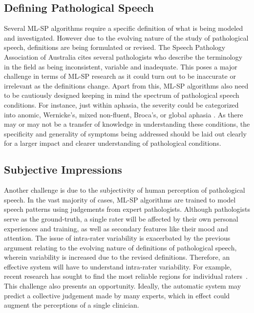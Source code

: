 \documentclass{article}
\begin{document}
\subsection{Defining Pathological Speech}
Several ML-SP algorithms require a specific definition of what is being modeled and investigated.
However due to the evolving nature of the study of pathological speech, definitions are being formulated or revised. 
The Speech Pathology Association of Australia \cite{australia2009criteria} cites several pathologists who describe the terminology in the field as being inconsistent, variable and inadequate. 
This poses a major challenge in terms of ML-SP research as it could turn out to be inaccurate or irrelevant as the definitions change.
Apart from this, ML-SP algorithms also need to be cautiously designed keeping in mind the spectrum of pathological speech conditions.
For instance, just within aphasia, the severity could be categorized into anomic, Wernicke's, mixed non-fluent, Broca's, or global aphasia \cite{mesulam1992primary}. 
As there may or may not be a transfer of knowledge in understanding these conditions, the specificity and generality of symptoms being addressed should be laid out clearly for a larger impact and clearer understanding of pathological conditions. 


\subsection{Subjective Impressions}
Another challenge is due to the subjectivity of human perception of pathological speech. In the vast majority of cases, ML-SP algorithms are trained to model speech patterns using judgements from expert pathologists.
Although pathologists serve as the ground-truth, a single rater will be affected by their own personal experiences and training, as well as secondary features like their mood and attention. The issue of intra-rater variability is exacerbated by the previous argument relating to the evolving nature of definitions of pathological speech, wherein variability is increased due to the revised definitions. Therefore, an effective system will have to understand intra-rater variability. For example, recent research has sought to find the most reliable regions for individual raters~\cite{}. This challenge also presents an opportunity. Ideally, the automatic system may predict a collective judgement made by many experts, which in effect could augment the perceptions of a single clinician.
\end{document}

